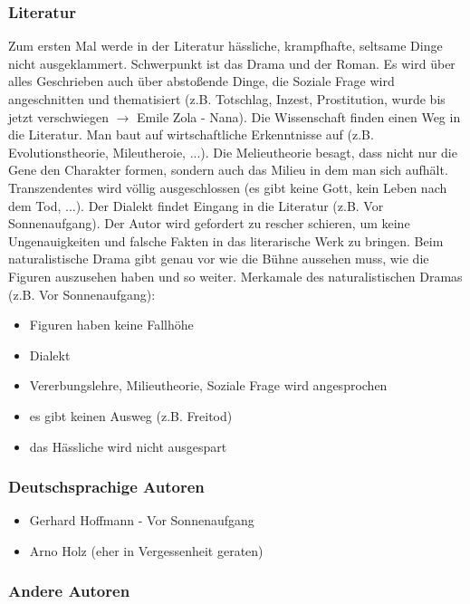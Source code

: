 \documentclass[12pt,a4paper]{article}
\begin{document}
\subsubsection{Literatur}

Zum ersten Mal werde in der Literatur hässliche, krampfhafte, seltsame Dinge nicht ausgeklammert. Schwerpunkt ist das Drama und der Roman. Es wird über alles Geschrieben auch über  abstoßende Dinge, die Soziale Frage wird angeschnitten und thematisiert (z.B. Totschlag, Inzest, Prostitution, wurde bis jetzt verschwiegen $\rightarrow$ Emile Zola - Nana). Die Wissenschaft finden einen Weg in die Literatur. Man baut auf wirtschaftliche Erkenntnisse auf (z.B. Evolutionstheorie, Mileutheroie, ...). Die Melieutheorie besagt, dass nicht nur die Gene den Charakter formen, sondern auch das Milieu in dem man sich aufhält. Transzendentes wird völlig ausgeschlossen (es gibt keine Gott, kein Leben nach dem Tod, ...). Der Dialekt findet Eingang in die Literatur (z.B. Vor Sonnenaufgang). Der Autor wird gefordert zu rescher schieren, um keine Ungenauigkeiten und falsche Fakten in das literarische Werk zu bringen.
\newline
Beim naturalistische Drama gibt genau vor wie die Bühne aussehen muss, wie die Figuren auszusehen haben und so weiter. 
Merkamale des naturalistischen Dramas (z.B. Vor Sonnenaufgang):

\begin{itemize}
\item Figuren haben keine Fallhöhe
\item Dialekt
\item Vererbungslehre, Milieutheorie, Soziale Frage wird angesprochen
\item es gibt keinen Ausweg (z.B. Freitod)
\item das Hässliche wird nicht ausgespart
\end{itemize}

\subsubsection{Deutschsprachige Autoren}

\begin{itemize}
\item Gerhard Hoffmann - Vor Sonnenaufgang
\item Arno Holz (eher in Vergessenheit geraten)
\end{itemize}

\subsubsection{Andere Autoren}
\end{document}
